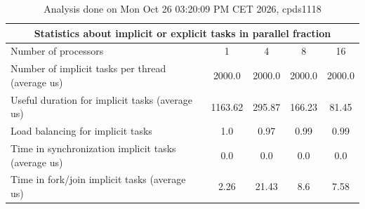 \begin{table}[h]
\begin{center}
\begin{tabular}{|l|c|c|c|c|}
\hline
\multicolumn{5}{|c|}{Statistics about implicit or explicit tasks in parallel fraction} \\
\hline
\hline
Number of processors & 1 & 4 & 8 & 16 \\
\hline
\hline
Number of implicit tasks per thread (average us)    &          2000.0 &          2000.0 &          2000.0 &          2000.0 \\
\hline
Useful duration for implicit tasks (average us)     &         1163.62 &          295.87 &          166.23 &           81.45 \\
\hline
Load balancing for implicit tasks                &             1.0 &            0.97 &            0.99 &            0.99 \\
\hline
Time in synchronization implicit tasks (average us) &             0.0 &             0.0 &             0.0 &             0.0 \\
\hline
Time in fork/join implicit tasks (average us)       &            2.26 &           21.43 &             8.6 &            7.58 \\
\hline
\end{tabular}
\end{center}
\caption{ Analysis done on Mon Oct 26 03:20:09 PM CET 2026, cpds1118}
\end{table}
